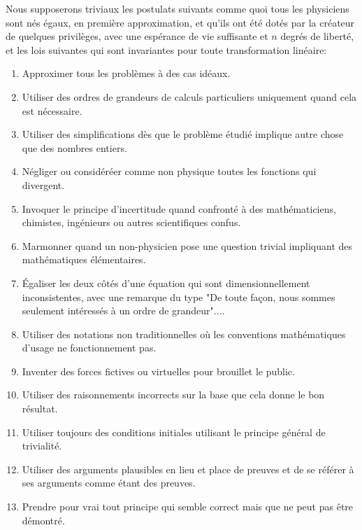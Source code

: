 Nous supposerons triviaux les postulats suivants comme quoi tous les physiciens sont nés égaux, en première approximation, et qu'ils ont été dotés par la créateur de quelques privilèges, avec une espérance de vie suffisante et $n$ degrés de liberté, et les lois suivantes qui sont invariantes pour toute transformation linéaire:
\begin{enumerate}
	\item Approximer tous les problèmes à des cas idéaux.

	\item Utiliser des ordres de grandeurs de calculs particuliers uniquement quand cela est nécessaire.

	\item Utiliser des simplifications dès que le problème étudié implique autre chose que des nombres entiers.

	\item Négliger ou considéréer comme non physique toutes les fonctions qui divergent.

	\item  Invoquer le principe d'incertitude quand confronté à des mathématiciens, chimistes, ingénieurs ou autres scientifiques confus.

	\item  Marmonner quand un non-physicien pose une question trivial impliquant des mathématiques élémentaires.

	\item Égaliser les deux côtés d'une équation qui sont dimensionnellement inconsistentes, avec une remarque du type "De toute façon, nous sommes seulement intéressés à un ordre de grandeur"....

	\item Utiliser des notations non traditionnelles où les conventions mathématiques d'usage ne fonctionnement pas.

	\item Inventer des forces fictives ou virtuelles pour brouillet le public. 

	\item Utiliser des raisonnements incorrects sur la base que cela donne le bon résultat.

	\item Utiliser toujours des conditions initiales utilisant le principe général de trivialité.

	\item Utiliser des arguments plausibles en lieu et place de preuves et de se référer à ses arguments comme étant des preuves.

	\item Prendre pour vrai tout principe qui semble correct mais que ne peut pas être démontré.
\end{enumerate}

